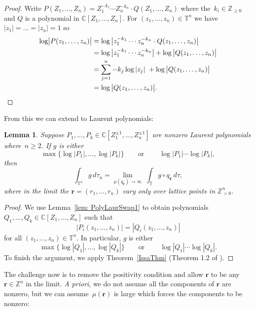 \documentclass[12pt]{amsart}
\theoremstyle{plain}
\newtheorem{lemma}[theorem]{Lemma}
\theoremstyle{definition}
\theoremstyle{remark}
\numberwithin{theorem}{section}
\numberwithin{equation}{section} %
\newcommand{\CC}{\mathbb{C}}
\newcommand{\ZZ}{\mathbb{Z}}
\newcommand{\bZ}{{\mathbb{Z}}}
\newcommand{\bC}{{\mathbb{C}}}
\newcommand{\mb}{\mathbf}
\newcommand{\torus}{{\mathbb{T}}}
\begin{document}
\begin{proof}
    Write $P(Z_1,\dots, Z_n)=Z_1^{-k_1}\cdots Z_n^{-k_n} \cdot Q(Z_1,\dots, Z_n)$ where the~$k_i\in \ZZ_{\geq 0}$ and $Q$ is a polynomial in $\CC[Z_1,\dots, Z_n]$. For $(z_1,\dots, z_n)\in \torus^n$ we have
    $|z_1| = \ldots = |z_n| = 1$ so
    \begin{align*}
            \log\bigl|P(z_1,\dots, z_n)\bigr|      &=\log\big|z_1^{-k_1}\cdots z_n^{-k_n} \cdot Q (z_1,\dots, z_n)\big|\\
            &=\log\big|z_1^{-k_1}\cdots z_n^{-k_n}\big|+ \log\big|Q(z_1,\dots, z_n)\big|\\
            &=\sum_{j=1}^n-k_j\log|z_j| \ +\log\big|Q(z_1,\dots, z_n)\big|\\
            &=\log\big|Q(z_1,\dots, z_n)\big|. \qedhere
    \end{align*}
\end{proof}

From this we can extend \cite[Theorem~1.2]{Issa2013} to Laurent polynomials:

\begin{lemma}\label{lem: PolyLaurSwap2}
   Suppose $P_1, \ldots, P_k \in\CC\left[Z_1^{\pm1},\dots, Z_n^{\pm1}\right]$ are  nonzero Laurent polynomials where~$n \ge 2$.
If $g$ is either
    $$
    \max \{ \log|P_1|, \ldots, \log|P_k| \}
    \qquad\text{or}\qquad
    \ \log|P_1| \cdots \log|P_k| ,
    $$
    then
    $$
\int_{\torus^n}  g \, d\tau_n= \lim_{\mu(q_\mb r)\to \infty}\;  \int_\torus g \circ q_{\mb r} \, d \tau,
$$
 where in the limit  the $\mb r = (r_1, \ldots, r_n)$ vary only over lattice points in $\bZ^n_{>0}$.
\end{lemma}

\begin{proof}
We use Lemma~\ref{lem: PolyLaurSwap1} to obtain polynomials $Q_1, \ldots, Q_k  \in \bC[Z_1, \ldots, Z_n]$ such that 
    $$
    | P_i(z_1, \dots, z_n) | = |Q_i (z_1, \dots, z_n)|
    $$
    for all $(z_1, \ldots, z_n) \in \torus^n$.
In particular,  $g$ is either
    $$
    \max \{ \log|Q_1|, \ldots, \log|Q_k| \}
    \qquad\text{or}\qquad
    \ \log|Q_1| \cdots \log|Q_k| .
    $$
To finish the argument, we apply Theorem~\ref{IssaThm} (Theorem 1.2 of \cite{Issa2013}).
\end{proof}


The challenge now is to remove the positivity condition and allow $\mb r$ to be any $\mb r \in \bZ^n$ in the limit. 
\emph{A priori}, we do not assume all the components of $\mb r$ are nonzero, but we can assume~$\mu(\mb r)$ is large
which forces the components to be nonzero:
\end{document}
